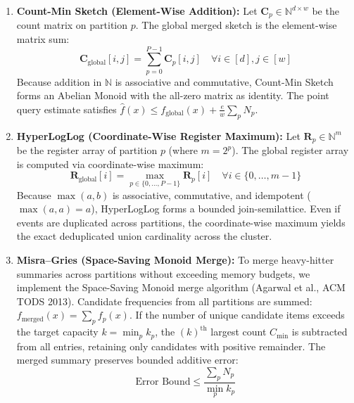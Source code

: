 \begin{enumerate}
    \item \textbf{Count-Min Sketch (Element-Wise Addition):}
    Let $\mathbf{C}_p \in \mathbb{N}^{d \times w}$ be the count matrix on partition $p$. The global merged sketch is the element-wise matrix sum:
    \begin{equation}
        \mathbf{C}_{\text{global}}[i, j] = \sum_{p=0}^{P-1} \mathbf{C}_p[i, j] \quad \forall i \in [d], j \in [w]
    \end{equation}
    Because addition in $\mathbb{N}$ is associative and commutative, Count-Min Sketch forms an Abelian Monoid with the all-zero matrix as identity. The point query estimate satisfies $\hat{f}(x) \le f_{\text{global}}(x) + \frac{e}{w} \sum_p N_p$.

    \item \textbf{HyperLogLog (Coordinate-Wise Register Maximum):}
    Let $\mathbf{R}_p \in \mathbb{N}^m$ be the register array of partition $p$ (where $m = 2^p$). The global register array is computed via coordinate-wise maximum:
    \begin{equation}
        \mathbf{R}_{\text{global}}[i] = \max_{p \in \{0, \dots, P-1\}} \mathbf{R}_p[i] \quad \forall i \in \{0, \dots, m-1\}
    \end{equation}
    Because $\max(a, b)$ is associative, commutative, and idempotent ($\max(a, a) = a$), HyperLogLog forms a bounded join-semilattice. Even if events are duplicated across partitions, the coordinate-wise maximum yields the exact deduplicated union cardinality across the cluster.

    \item \textbf{Misra--Gries (Space-Saving Monoid Merge):}
    To merge heavy-hitter summaries across partitions without exceeding memory budgets, we implement the Space-Saving Monoid merge algorithm (Agarwal et al., ACM TODS 2013). Candidate frequencies from all partitions are summed: $f_{\text{merged}}(x) = \sum_p f_p(x)$. If the number of unique candidate items exceeds the target capacity $k = \min_p k_p$, the $(k)^{\text{th}}$ largest count $C_{\min}$ is subtracted from all entries, retaining only candidates with positive remainder. The merged summary preserves bounded additive error:
    \begin{equation}
        \text{Error Bound} \le \frac{\sum_p N_p}{\min_p k_p}
    \end{equation}
\end{enumerate}

